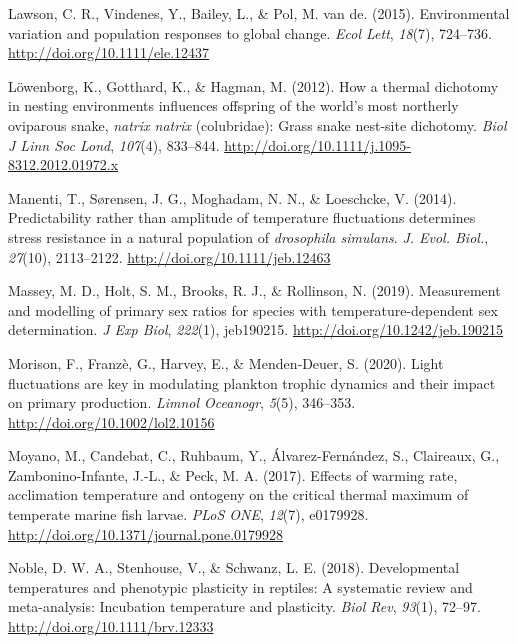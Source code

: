 \documentclass[12pt,twoside]{reedthesis}
\begin{document}
\leavevmode\hypertarget{ref-lawson_environmental_2015}{}%
Lawson, C. R., Vindenes, Y., Bailey, L., \& Pol, M. van de. (2015). Environmental variation and population responses to global change. \emph{Ecol Lett}, \emph{18}(7), 724--736. \url{http://doi.org/10.1111/ele.12437}

\leavevmode\hypertarget{ref-lowenborg_how_2012}{}%
Löwenborg, K., Gotthard, K., \& Hagman, M. (2012). How a thermal dichotomy in nesting environments influences offspring of the world's most northerly oviparous snake, \emph{natrix natrix} (colubridae): Grass snake nest-site dichotomy. \emph{Biol J Linn Soc Lond}, \emph{107}(4), 833--844. \url{http://doi.org/10.1111/j.1095-8312.2012.01972.x}

\leavevmode\hypertarget{ref-manenti_predictability_2014-2}{}%
Manenti, T., Sørensen, J. G., Moghadam, N. N., \& Loeschcke, V. (2014). Predictability rather than amplitude of temperature fluctuations determines stress resistance in a natural population of \emph{drosophila simulans}. \emph{J. Evol. Biol.}, \emph{27}(10), 2113--2122. \url{http://doi.org/10.1111/jeb.12463}

\leavevmode\hypertarget{ref-massey_measurement_2019}{}%
Massey, M. D., Holt, S. M., Brooks, R. J., \& Rollinson, N. (2019). Measurement and modelling of primary sex ratios for species with temperature-dependent sex determination. \emph{J Exp Biol}, \emph{222}(1), jeb190215. \url{http://doi.org/10.1242/jeb.190215}

\leavevmode\hypertarget{ref-morison_light_2020}{}%
Morison, F., Franzè, G., Harvey, E., \& Menden‐Deuer, S. (2020). Light fluctuations are key in modulating plankton trophic dynamics and their impact on primary production. \emph{Limnol Oceanogr}, \emph{5}(5), 346--353. \url{http://doi.org/10.1002/lol2.10156}

\leavevmode\hypertarget{ref-moyano_effects_2017}{}%
Moyano, M., Candebat, C., Ruhbaum, Y., Álvarez-Fernández, S., Claireaux, G., Zambonino-Infante, J.-L., \& Peck, M. A. (2017). Effects of warming rate, acclimation temperature and ontogeny on the critical thermal maximum of temperate marine fish larvae. \emph{PLoS ONE}, \emph{12}(7), e0179928. \url{http://doi.org/10.1371/journal.pone.0179928}

\leavevmode\hypertarget{ref-noble_developmental_2018}{}%
Noble, D. W. A., Stenhouse, V., \& Schwanz, L. E. (2018). Developmental temperatures and phenotypic plasticity in reptiles: A systematic review and meta-analysis: Incubation temperature and plasticity. \emph{Biol Rev}, \emph{93}(1), 72--97. \url{http://doi.org/10.1111/brv.12333}
\end{document}
